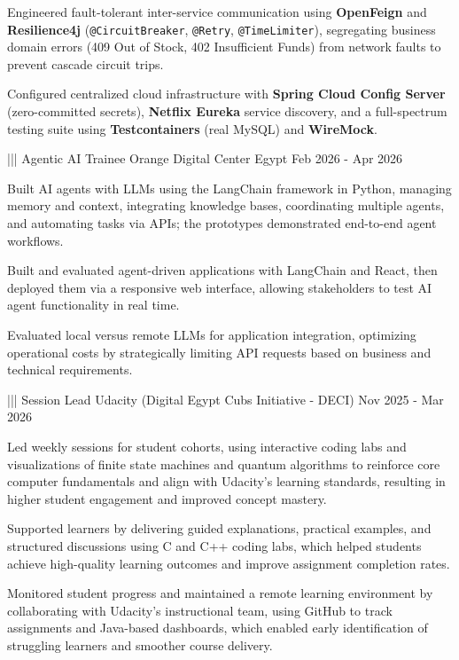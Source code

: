 {{        \item Engineered fault-tolerant inter-service communication using \textbf{OpenFeign} and \textbf{Resilience4j} (\texttt{@CircuitBreaker}, \texttt{@Retry}, \texttt{@TimeLimiter}), segregating business domain errors (409 Out of Stock, 402 Insufficient Funds) from network faults to prevent cascade circuit trips.
        \item Configured centralized cloud infrastructure with \textbf{Spring Cloud Config Server} (zero-committed secrets), \textbf{Netflix Eureka} service discovery, and a full-spectrum testing suite using \textbf{Testcontainers} (real MySQL) and \textbf{WireMock}.
    }%
    |||
    {Agentic AI Trainee}%
    {Orange Digital Center Egypt}%
    {Feb 2026 - Apr 2026}%
    {%
        \item Built AI agents with LLMs using the LangChain framework in Python, managing memory and context, integrating knowledge bases, coordinating multiple agents, and automating tasks via APIs; the prototypes demonstrated end-to-end agent workflows.
        \item Built and evaluated agent-driven applications with LangChain and React, then deployed them via a responsive web interface, allowing stakeholders to test AI agent functionality in real time.
        \item Evaluated local versus remote LLMs for application integration, optimizing operational costs by strategically limiting API requests based on business and technical requirements.
    }%
    |||
    {Session Lead}%
    {Udacity (Digital Egypt Cubs Initiative - DECI)}%
    {Nov 2025 - Mar 2026}%
    {%
    \item Led weekly sessions for student cohorts, using interactive coding labs and visualizations of finite state machines and quantum algorithms to reinforce core computer fundamentals and align with Udacity's learning standards, resulting in higher student engagement and improved concept mastery.
    \item Supported learners by delivering guided explanations, practical examples, and structured discussions using C and C++ coding labs, which helped students achieve high-quality learning outcomes and improve assignment completion rates.
    \item Monitored student progress and maintained a remote learning environment by collaborating with Udacity's instructional team, using GitHub to track assignments and Java-based dashboards, which enabled early identification of struggling learners and smoother course delivery.
}}
